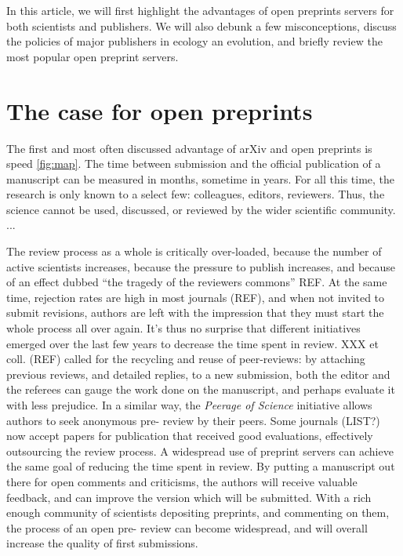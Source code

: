 \documentclass[letterpaper,twocolumn,superscriptaddress,showkeys]{revtex4}
\begin{document}
In this article, we will first highlight the advantages of open preprints
servers for both scientists and publishers. We will also debunk a few
misconceptions, discuss the policies of major publishers in ecology an
evolution, and briefly review the most popular open preprint servers.

\section{The case for open preprints}

The first and most often discussed advantage of arXiv and open preprints is
speed \ref{fig:map}. The time between submission and the official publication of
a manuscript can be measured in months, sometime in years. For all this time,
the research is only known to a select few: colleagues, editors, reviewers.
Thus, the science cannot be used, discussed, or reviewed by the wider scientific
community. ...


The review process as a whole is critically over-loaded, because the
number of active scientists increases, because the pressure to publish
increases, and because of an effect dubbed ``the tragedy of the
reviewers commons'' REF.  At the same time, rejection rates are high
in most journals (REF), and when not invited to submit revisions,
authors are left with the impression that they must start the whole
process all over again. It's thus no surprise that different
initiatives emerged over the last few years to decrease the time spent
in review. XXX et coll. (REF) called for the recycling and reuse of
peer-reviews: by attaching previous reviews, and detailed replies, to
a new submission, both the editor and the referees can gauge the work
done on the manuscript, and perhaps evaluate it with less
prejudice. In a similar way, the \emph{Peerage of Science} initiative
allows authors to seek anonymous pre- review by their peers. Some
journals (LIST?) now accept papers for publication that received good
evaluations, effectively outsourcing the review process. A widespread
use of preprint servers can achieve the same goal of reducing the time
spent in review. By putting a manuscript out there for open comments
and criticisms, the authors will receive valuable feedback, and can
improve the version which will be submitted. With a rich enough
community of scientists depositing preprints, and commenting on them,
the process of an open pre- review can become widespread, and will
overall increase the quality of first submissions.
\end{document}
